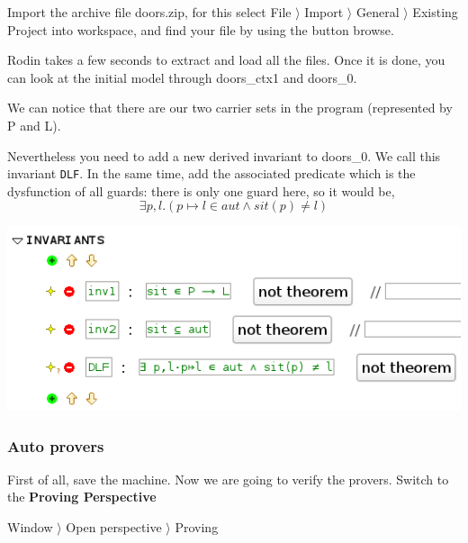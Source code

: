 Import the archive file doors.zip, for this select  \textsf{File $\rangle$ Import $\rangle$ General $\rangle$ Existing Project into workspace}, and find your file by using the button browse.

Rodin takes a few seconds to extract and load all the files. Once it is done, you can look at the initial model through \textsf{doors\_ctx1} and \textsf{doors\_0}.

We can notice that there are our two carrier sets in the program (represented by \textsf{P} and \textsf{L}).


Nevertheless you need to add a new derived invariant to doors\_0. We call this invariant \texttt{DLF}.
In the same time, add the associated predicate which is the dysfunction of all guards: there is only one guard here, so it would be,
\[
\exists p,l.(p \longmapsto l \in aut \land sit(p) \neq l )
\]



\begin{center}
	\includegraphics[]{img/tutorial/tut_10_new-invariant.png}
\end{center}

\subsubsection{Auto provers}

First of all, save the machine. Now we are going to verify the provers. 
Switch to the \textbf{Proving Perspective}

\textsf{ Window $\rangle$ Open perspective $\rangle$ Proving }

